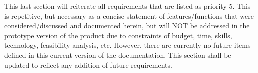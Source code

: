 This last section will reiterate all requirements that are listed as priority 5. This is repetitive, but necessary as a concise statement of features/functions that were considered/discussed and documented herein, but will NOT be addressed in the prototype version of the product due to constraints of budget, time, skills, technology, feasibility analysis, etc. However, there are currently no future items defined in this current version of the documentation. This section shall be updated to reflect any addition of future requirements.